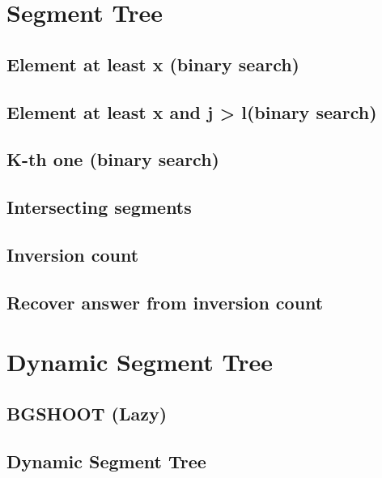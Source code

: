 \section{Segment Tree}
\subsection{Element at least x (binary search)}
\raggedbottom
\hrulefill
\subsection{Element at least x and j > l(binary search)}
\raggedbottom
\hrulefill
\subsection{K-th one (binary search)}
\raggedbottom
\hrulefill
\subsection{Intersecting segments}
\raggedbottom
\hrulefill
\subsection{Inversion count}
\raggedbottom
\hrulefill
\subsection{Recover answer from inversion count}
\raggedbottom
\hrulefill

\section{Dynamic Segment Tree}
\subsection{BGSHOOT (Lazy)}
\raggedbottom
\hrulefill
\subsection{Dynamic Segment Tree}
\raggedbottom
\hrulefill
